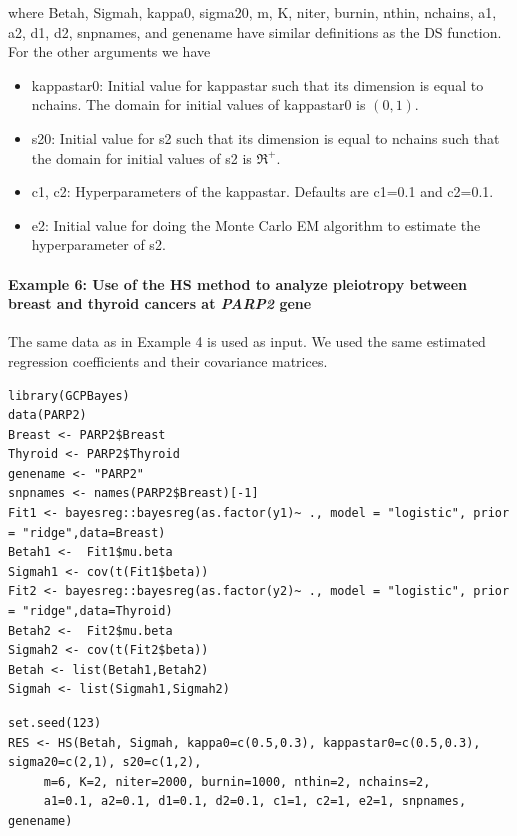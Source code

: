 where Betah, Sigmah, kappa0, sigma20, m, K, niter, burnin,
nthin, nchains, a1, a2, d1, d2, snpnames, and genename have similar definitions as the DS function. For the other arguments we have

\begin{itemize}
\item
  kappastar0: Initial value for kappastar such that its dimension is equal to nchains. The domain for initial values of kappastar0 is \((0,1)\).
\item
  s20: Initial value for s2 such that its dimension is equal to nchains such that the domain for initial values of s2 is \(\Re^+\).
\item
  c1, c2: Hyperparameters of the kappastar. Defaults are c1=0.1 and c2=0.1.
\item
  e2: Initial value for doing the Monte Carlo EM algorithm to estimate the hyperparameter of s2.
\end{itemize}

\hypertarget{example-6-use-of-the-hs-method-to-analyze-pleiotropy-between-breast-and-thyroid-cancers-at-parp2-gene}{%
\paragraph{\texorpdfstring{Example 6: Use of the HS method to analyze pleiotropy between breast and thyroid cancers at \emph{PARP2} gene}{Example 6: Use of the HS method to analyze pleiotropy between breast and thyroid cancers at PARP2 gene}}\label{example-6-use-of-the-hs-method-to-analyze-pleiotropy-between-breast-and-thyroid-cancers-at-parp2-gene}}

The same data as in Example 4 is used as input. We used the same estimated regression coefficients and their covariance matrices.

\begin{verbatim}
library(GCPBayes)
data(PARP2)
Breast <- PARP2$Breast
Thyroid <- PARP2$Thyroid
genename <- "PARP2"
snpnames <- names(PARP2$Breast)[-1]
Fit1 <- bayesreg::bayesreg(as.factor(y1)~ ., model = "logistic", prior = "ridge",data=Breast)
Betah1 <-  Fit1$mu.beta
Sigmah1 <- cov(t(Fit1$beta))
Fit2 <- bayesreg::bayesreg(as.factor(y2)~ ., model = "logistic", prior = "ridge",data=Thyroid)
Betah2 <-  Fit2$mu.beta
Sigmah2 <- cov(t(Fit2$beta))
Betah <- list(Betah1,Betah2)
Sigmah <- list(Sigmah1,Sigmah2)
\end{verbatim}

\begin{verbatim}
set.seed(123)
RES <- HS(Betah, Sigmah, kappa0=c(0.5,0.3), kappastar0=c(0.5,0.3), sigma20=c(2,1), s20=c(1,2),
     m=6, K=2, niter=2000, burnin=1000, nthin=2, nchains=2,
     a1=0.1, a2=0.1, d1=0.1, d2=0.1, c1=1, c2=1, e2=1, snpnames, genename)
\end{verbatim}

